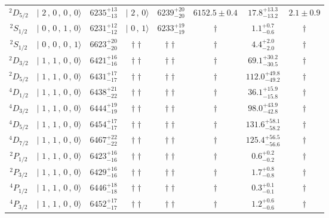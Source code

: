 \begin{tabular}{c| c c c c c c c}
$^{2}D_{5/2}$ & $\vert \,\,2\,,\,0\,,\,0\,,\,0 \rangle $ & $6235^{+13}_{-13}$ & $\vert \,\,2\,,\,0 \rangle$ & $6239^{+20}_{-20}$ & $6152.5\pm 0.4$ & $17.8^{+13.3}_{-13.2}$ & $2.1\pm 0.9$ \\ 
$^{2}S_{1/2}$ & $\vert \,\,0\,,\,0\,,\,1\,,\,0 \rangle $ & $6231^{+12}_{-12}$ & $\vert \,\,0\,,\,1 \rangle$ & $6233^{+19}_{-19}$ & $\dagger$ & $1.1^{+0.7}_{-0.6}$ & $\dagger$ \\ 
$^{2}S_{1/2}$ & $\vert \,\,0\,,\,0\,,\,0\,,\,1 \rangle $ & $6623^{+20}_{-20}$ & $\dagger\dagger$ & $\dagger\dagger$ & $\dagger$ & $4.4^{+2.0}_{-2.0}$ & $\dagger$ \\ 
$^{2}D_{3/2}$ & $\vert \,\,1\,,\,1\,,\,0\,,\,0 \rangle $ & $6421^{+16}_{-16}$ & $\dagger\dagger$ & $\dagger\dagger$ & $\dagger$ & $69.1^{+30.2}_{-30.5}$ & $\dagger$ \\ 
$^{2}D_{5/2}$ & $\vert \,\,1\,,\,1\,,\,0\,,\,0 \rangle $ & $6431^{+17}_{-17}$ & $\dagger\dagger$ & $\dagger\dagger$ & $\dagger$ & $112.0^{+49.8}_{-49.2}$ & $\dagger$ \\ 
$^{4}D_{1/2}$ & $\vert \,\,1\,,\,1\,,\,0\,,\,0 \rangle $ & $6438^{+21}_{-22}$ & $\dagger\dagger$ & $\dagger\dagger$ & $\dagger$ & $36.1^{+15.9}_{-15.8}$ & $\dagger$ \\ 
$^{4}D_{3/2}$ & $\vert \,\,1\,,\,1\,,\,0\,,\,0 \rangle $ & $6444^{+19}_{-19}$ & $\dagger\dagger$ & $\dagger\dagger$ & $\dagger$ & $98.0^{+43.9}_{-42.8}$ & $\dagger$ \\ 
$^{4}D_{5/2}$ & $\vert \,\,1\,,\,1\,,\,0\,,\,0 \rangle $ & $6454^{+17}_{-17}$ & $\dagger\dagger$ & $\dagger\dagger$ & $\dagger$ & $131.6^{+58.1}_{-58.2}$ & $\dagger$ \\ 
$^{4}D_{7/2}$ & $\vert \,\,1\,,\,1\,,\,0\,,\,0 \rangle $ & $6467^{+22}_{-22}$ & $\dagger\dagger$ & $\dagger\dagger$ & $\dagger$ & $125.4^{+56.5}_{-56.6}$ & $\dagger$ \\ 
$^{2}P_{1/2}$ & $\vert \,\,1\,,\,1\,,\,0\,,\,0 \rangle $ & $6423^{+16}_{-16}$ & $\dagger\dagger$ & $\dagger\dagger$ & $\dagger$ & $0.6^{+0.2}_{-0.2}$ & $\dagger$ \\ 
$^{2}P_{3/2}$ & $\vert \,\,1\,,\,1\,,\,0\,,\,0 \rangle $ & $6429^{+16}_{-16}$ & $\dagger\dagger$ & $\dagger\dagger$ & $\dagger$ & $1.7^{+0.8}_{-0.8}$ & $\dagger$ \\ 
$^{4}P_{1/2}$ & $\vert \,\,1\,,\,1\,,\,0\,,\,0 \rangle $ & $6446^{+18}_{-18}$ & $\dagger\dagger$ & $\dagger\dagger$ & $\dagger$ & $0.3^{+0.1}_{-0.1}$ & $\dagger$ \\ 
$^{4}P_{3/2}$ & $\vert \,\,1\,,\,1\,,\,0\,,\,0 \rangle $ & $6452^{+17}_{-17}$ & $\dagger\dagger$ & $\dagger\dagger$ & $\dagger$ & $1.2^{+0.6}_{-0.6}$ & $\dagger$ \\ 

\end{tabular}
